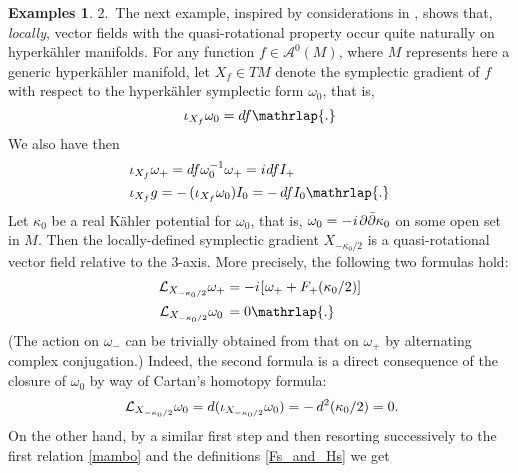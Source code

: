 \documentclass[11pt]{amsart}
\theoremstyle{remark}
\theoremstyle{remark}
\theoremstyle{definition}
\theoremstyle{definition}
\theoremstyle{definition}
\newtheorem*{examples}{Examples}
\newcommand{\0}{{\scriptstyle 0'}} %
\newcommand{\1}{{\scriptstyle 1'}}
\newcommand{\pt}{\hspace{1pt}} %
\newcommand{\hp}{\hspace{0.5pt}} %
\begin{document}
\begin{examples}
2.~\noindent The next example, inspired by considerations in \cite{Lindstrom:2008gs}, shows that, \textit{locally}, vector fields with the quasi-rotational property occur quite naturally on hyperk\"ahler manifolds. For any function \mbox{$f \in \mathscr{A}^0(M)$}, where $M$ represents here a generic hyperk\"ahler manifold, let \mbox{$X_f \in TM$} denote the symplectic gradient of $f$ with respect to the hyperk\"ahler symplectic form $\omega_0$, that is,
\begin{equation} 
\iota_{X_f}\omega_0 = df \mathrlap{.}
\end{equation}
We also have then
\begin{equation} \label{mambo}
\begin{aligned}
& \iota_{X_f}\omega_+ = df \omega_0^{-1}\omega_+ = i \hp df I_+ \\[1pt]
& \iota_{X_f} g = - \, (\iota_{X_f}\omega_0) I_0 = - \, df I_0 \mathrlap{.}
\end{aligned}
\end{equation}
Let $\kappa_0$ be a real K\"ahler potential for $\omega_0$, that is, $\omega_0 = - \hp i \pt \partial\bar{\partial} \kappa_0$ on some open set in $M$. Then the locally-defined symplectic gradient  $X_{-\kappa_0/2}$ \pagebreak is a quasi-rotational vector field relative to the 3-axis. More precisely, the following two formulas hold:%
\begin{equation} \label{X_k0/2}
\begin{aligned}
\mathcal{L}_{X_{-\kappa_0/2}} \omega_+ & = -i \hp [ \hp \omega_+ + F_+(\kappa_0/2)] \\[1pt]
\mathcal{L}_{X_{-\kappa_0/2}} \omega_0 \, & = 0 \mathrlap{.}
\end{aligned}
\end{equation}
(The action on $\omega_-$ can be trivially obtained from that on $\omega_+$ by alternating complex conjugation.) Indeed, the second formula is a direct consequence of the closure of $\omega_0$ by way of Cartan's homotopy formula:
\begin{equation}
\mathcal{L}_{X_{-\kappa_0/2}} \omega_0 = d(\iota_{X_{-\kappa_0/2}}\omega_0) = - \, d^2 (\kappa_0/2) = 0 \rlap{.}
\end{equation}
On the other hand, by a similar first step and then resorting successively to the first relation \eqref{mambo} and the definitions \eqref{Fs_and_Hs} we get
\begin{equation}

\end{equation}
\end{examples}
\end{document}
